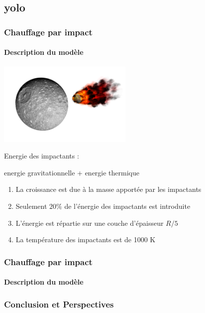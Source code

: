 \documentclass{beamer}
\begin{document}
\subsection{yolo}

\begin{frame}
	\frametitle{Chauffage par impact}
	\framesubtitle{Description du modèle}
	
\vspace{-0.3cm}
\center \includegraphics[height = 4cm]{figures/impact.pdf}  


Energie des impactants : 

energie gravitationnelle + energie thermique
\vspace{0.5cm}

\begin{enumerate}
\item La croissance est due à la masse apportée par les impactants
\item Seulement $20\%$ de l'énergie des impactants est introduite
\item L'énergie est répartie sur une couche d'épaisseur $R/5$
\item La température des impactants est de 1000 K 
\end{enumerate}
\end{frame}

\begin{frame}
	\frametitle{Chauffage par impact}
	\framesubtitle{Description du modèle}
	
\end{frame}

\begin{frame}
	\frametitle{Conclusion et Perspectives}
	\framesubtitle{\ }
	

	
\end{frame}
\end{document}
